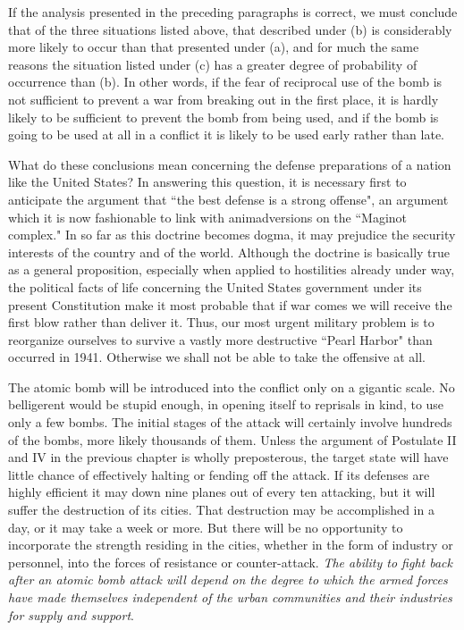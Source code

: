 If the analysis presented in the preceding paragraphs is correct, we must conclude that of the three situations listed above, that described under (b) is considerably more likely to occur than that presented under (a), and for much the same reasons the situation listed under (c) has a greater degree of probability of occurrence than (b). In other words, if the fear of reciprocal use of the bomb is not sufficient to prevent a war from breaking out in the first place, it is hardly likely to be sufficient to prevent the bomb from being used, and if the bomb is going to be used at all in a conflict it is likely to be used early rather than late.

What do these conclusions mean concerning the defense preparations of a nation like the United States? In answering this question, it is necessary first to anticipate the argument that ``the best defense is a strong offense", an argument which it is now fashionable to link with animadversions on the ``Maginot complex." In so far as this doctrine becomes dogma, it may prejudice the security interests of the country and of the world. Although the doctrine is basically true as a general proposition, especially when applied to hostilities already under way, the political facts of life concerning the United States government under its present Constitution make it most probable that if war comes we will receive the first blow rather than deliver it. Thus, our most urgent military problem is to reorganize ourselves to survive a vastly more destructive ``Pearl Harbor" than occurred in 1941. Otherwise we shall not be able to take the offensive at all.

\label{II-Retaliation3}

The atomic bomb will be introduced into the conflict only on a gigantic scale. No belligerent would be stupid enough, in opening itself to reprisals in kind, to use only a few bombs. The initial stages of the attack will certainly involve hundreds of the bombs, more likely thousands of them. Unless the argument of Postulate II and IV in the previous chapter is wholly preposterous, the target state will have little chance of effectively halting or fending off the attack. If its defenses are highly efficient it may down nine planes out of every ten attacking, but it will suffer the destruction of its cities. That destruction may be accomplished in a day, or it may take a week or more. But there will be no opportunity to incorporate the strength residing in the cities, whether in the form of industry or personnel, into the forces of resistance or counter-attack. \emph{The ability to fight back after an atomic bomb attack will depend on the degree to which the armed forces have made themselves independent of the urban communities and their industries for supply and support}.

